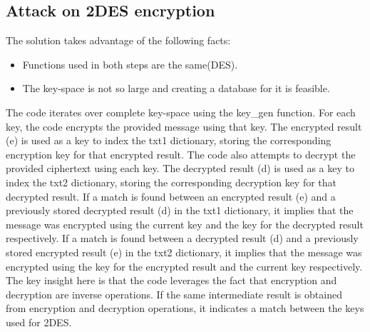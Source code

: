 \documentclass{article}
\begin{document}
\subsection{Attack on 2DES encryption}

The solution takes advantage of the following facts:
\begin{itemize}
    \item Functions used in both steps are the same(DES).
    \item The key-space is not so large and creating a database for it is feasible.
\end{itemize}
The code iterates over complete key-space using the key\_gen function. 
For each key, the code encrypts the provided message using that key. The encrypted result (e) is used as a key to index the txt1 dictionary, storing the corresponding encryption key for that encrypted result. The code also attempts to decrypt the provided ciphertext using each key.
The decrypted result (d) is used as a key to index the txt2 dictionary, storing the corresponding decryption key for that decrypted result. If a match is found between an encrypted result (e) and a previously stored decrypted result (d) in the txt1 dictionary, it implies that the message was encrypted using the current key and the key for the decrypted result respectively.
If a match is found between a decrypted result (d) and a previously stored encrypted result (e) in the txt2 dictionary, it implies that the message was encrypted using the key for the encrypted result and the current key respectively. The key insight here is that the code leverages the fact that encryption and decryption are inverse operations. If the same intermediate result is obtained from encryption and decryption operations, it indicates a match between the keys used for 2DES.
\end{document}
